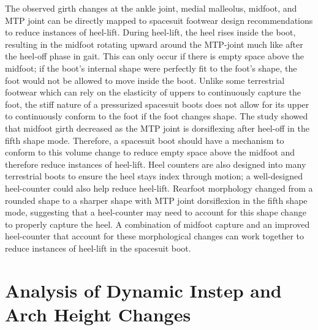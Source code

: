 \documentclass[defaultstyle,11pt]{comps}
\providecommand{\DIFaddbegin}{} %
\providecommand{\DIFaddend}{} %
\providecommand{\DIFdelbegin}{} %
\providecommand{\DIFdelend}{} %
\newcommand{\DIFscaledelfig}{0.5}
\newlength{\DIFdelgraphicswidth} %
\newlength{\DIFdelgraphicsheight} %
\newcommand{\DIFaddincludegraphics}[2][]{{\color{blue}\fbox{\DIFOincludegraphics[#1]{#2}}}} %
\newcommand{\DIFdelincludegraphics}[2][]{%
\sbox{\DIFdelgraphicsbox}{\DIFOincludegraphics[#1]{#2}}%
\settoboxwidth{\DIFdelgraphicswidth}{\DIFdelgraphicsbox} %
\settoboxtotalheight{\DIFdelgraphicsheight}{\DIFdelgraphicsbox} %
\scalebox{\DIFscaledelfig}{%
\parbox[b]{\DIFdelgraphicswidth}{\usebox{\DIFdelgraphicsbox}\\[-\baselineskip] \rule{\DIFdelgraphicswidth}{0em}}\llap{\resizebox{\DIFdelgraphicswidth}{\DIFdelgraphicsheight}{%
\setlength{\unitlength}{\DIFdelgraphicswidth}%
\begin{picture}(1,1)%
\thicklines\linethickness{2pt} %
{\color[rgb]{1,0,0}\put(0,0){\framebox(1,1){}}}%
{\color[rgb]{1,0,0}\put(0,0){\line( 1,1){1}}}%
{\color[rgb]{1,0,0}\put(0,1){\line(1,-1){1}}}%
\end{picture}%
}\hspace*{3pt}}} %
} %
\DeclareRobustCommand{\DIFaddbegin}{\DIFOaddbegin \let\includegraphics\DIFaddincludegraphics} %
\DeclareRobustCommand{\DIFaddend}{\DIFOaddend \let\includegraphics\DIFOincludegraphics} %
\DeclareRobustCommand{\DIFdelbegin}{\DIFOdelbegin \let\includegraphics\DIFdelincludegraphics} %
\DeclareRobustCommand{\DIFdelend}{\DIFOaddend \let\includegraphics\DIFOincludegraphics} %
\begin{document}
The observed girth changes at the ankle joint, medial malleolus, midfoot, and MTP joint can be directly mapped to spacesuit footwear design recommendations to reduce instances of heel-lift.
During heel-lift, the heel rises inside the boot, resulting in the midfoot rotating upward around the MTP-joint much like after the heel-off phase in gait.
This can only occur if there is empty space above the midfoot; if the boot's internal shape were perfectly fit to the foot's shape, the foot would not be allowed to move inside the boot.
Unlike some terrestrial footwear which can rely on the elasticity of uppers to continuously capture the foot, the stiff nature of a pressurized spacesuit boots does not allow for its upper to continuously conform to the foot if the foot changes shape.
The study showed that midfoot girth decreased as the MTP joint is dorsiflexing after heel-off in the fifth shape mode.
Therefore, a spacesuit boot should have a mechanism to conform to this volume change to reduce empty space above the midfoot and therefore reduce instances of heel-lift.
Heel counters are also designed into many terrestrial boots to ensure the heel stays index through motion; a well-designed heel-counter could also help reduce heel-lift.
Rearfoot morphology changed from a rounded shape to a sharper shape with MTP joint dorsiflexion in the fifth shape mode, suggesting that a heel-counter may need to account for this shape change to properly capture the heel.
A combination of midfoot capture and an improved heel-counter that account for these morphological changes can work together to reduce instances of heel-lift in the spacesuit boot.

\DIFdelbegin %
\DIFdelend \DIFaddbegin \hypertarget{analysis-of-dynamic-instep-and-arch-height-changes}{%
\section{Analysis of Dynamic Instep and Arch Height Changes}\label{analysis-of-dynamic-instep-and-arch-height-changes}}
\DIFaddend 
\end{document}
